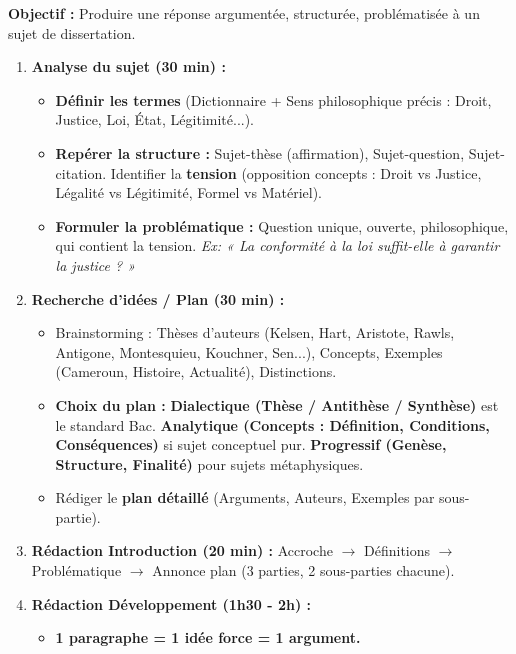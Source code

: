 \documentclass[11pt]{article}
\begin{document}
\begin{methode}
    \textbf{Objectif :} Produire une réponse argumentée, structurée, problématisée à un sujet de dissertation.
    \begin{enumerate}
        \item \textbf{Analyse du sujet (30 min) :} 
            \begin{itemize}
                \item \textbf{Définir les termes} (Dictionnaire + Sens philosophique précis : Droit, Justice, Loi, État, Légitimité...).
                \item \textbf{Repérer la structure :} Sujet-thèse (affirmation), Sujet-question, Sujet-citation. Identifier la \textbf{tension} (opposition concepts : Droit vs Justice, Légalité vs Légitimité, Formel vs Matériel).
                \item \textbf{Formuler la problématique :} Question unique, ouverte, philosophique, qui contient la tension. \emph{Ex: « La conformité à la loi suffit-elle à garantir la justice ? »}
            \end{itemize}
        \item \textbf{Recherche d'idées / Plan (30 min) :} 
            \begin{itemize}
                \item Brainstorming : Thèses d'auteurs (Kelsen, Hart, Aristote, Rawls, Antigone, Montesquieu, Kouchner, Sen...), Concepts, Exemples (Cameroun, Histoire, Actualité), Distinctions.
                \item \textbf{Choix du plan :} \textbf{Dialectique (Thèse / Antithèse / Synthèse)} est le standard Bac. \textbf{Analytique (Concepts : Définition, Conditions, Conséquences)} si sujet conceptuel pur. \textbf{Progressif (Genèse, Structure, Finalité)} pour sujets métaphysiques.
                \item Rédiger le \textbf{plan détaillé} (Arguments, Auteurs, Exemples par sous-partie).
            \end{itemize}
        \item \textbf{Rédaction Introduction (20 min) :} Accroche $\rightarrow$ Définitions $\rightarrow$ Problématique $\rightarrow$ Annonce plan (3 parties, 2 sous-parties chacune).
        \item \textbf{Rédaction Développement (1h30 - 2h) :} 
            \begin{itemize}
                \item \textbf{1 paragraphe = 1 idée force = 1 argument.}

\end{itemize}
\end{enumerate}
\end{methode}
\end{document}

